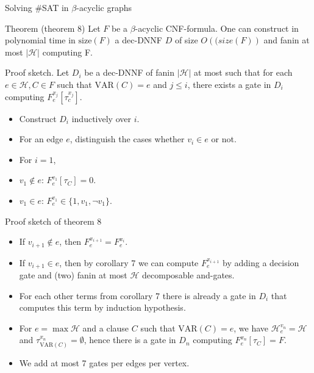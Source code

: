 \begin{frame}[t]{Solving \#SAT in $\beta$-acyclic graphs}
	\begin{block}{Theorem (theorem 8)}
		Let $F$ be a $\beta$-acyclic CNF-formula. One can construct in polynomial time in $\mathrm{size}(F)$ a dec-DNNF $D$ of size $O(\mathrm(size(F))$ and fanin at most $|\mathcal{H}|$ computing F.
	\end{block}
	\pause
	Proof sketch.
	Let $D_i$ be a dec-DNNF of fanin $|\mathcal{H}|$ at most such that for each $e \in \mathcal{H}, C \in F$ such that $\mathrm{VAR}(C) = e$ and $j \leq i$, there exists a gate in $D_i$ computing $F^{x_j}_e[\tau^{x_j}_c]$.
	\pause
	\begin{itemize}[<+->]
		\item Construct $D_i$ inductively over $i$.
		\item For an edge $e$, distinguish the cases whether $v_i \in e$ or not.
		\item For $i=1$,
		\item[]\hspace{1cm}$v_1 \notin e$: $F^{v_1}_e[\tau_C] = 0$.
		\item[]\hspace{1cm}$v_1 \in e$: $F^{v_1}_e \in \{1, v_1, \lnot v_1\}$.
	\end{itemize}
\end{frame}
\begin{frame}[t]{Proof sketch of theorem 8}
	\begin{itemize}[<+->]
		\item If $v_{i+1} \notin e$, then $F^{x_{i+1}}_e = F^{x_i}_e$.

		\item If $v_{i+1} \in e$, then by corollary 7 we can compute $F^{x_{i+1}}_e$ by adding a decision gate and (two) fanin at most $\mathcal{H}$ decomposable and-gates.
		
		\item[]\hspace{1cm}For each other terms from corollary 7 there is already a gate in $D_i$ that computes this term by induction hypothesis. 
		\item For $e = \max\mathcal{H}$ and a clause $C$ such that $\mathrm{VAR}(C) = e$, we have $\mathcal{H}^{v_n}_e = \mathcal{H}$ and $\tau^{x_n}_{\mathrm{VAR}(C)} = \emptyset$, hence there is a gate in $D_n$ computing $F^{x_n}_e[\tau_C] = F$.
		\item We add at most 7 gates per edges per vertex.
	\end{itemize}

\end{frame}

